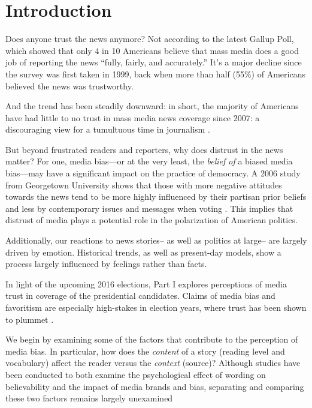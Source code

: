 
\chapter{Introduction} 

Does anyone trust the news anymore? Not according to the latest Gallup Poll, which showed that only 4 in 10 Americans believe that mass media does a good job of reporting the news ``fully, fairly, and accurately.'' It's a major decline since the survey was first taken in 1999, back when more than half (55\%) of Americans believed the news was trustworthy.

And the trend has been steadily downward: in short, the majority of Americans have had little to no trust in mass media news coverage since 2007: a discouraging view for a tumultuous time in journalism \cite{Gallup-trust-2015}.

But beyond frustrated readers and reporters, why does distrust in the news matter? For one, media bias---or at the very least, the \emph{belief of} a biased media bias---may have a significant impact on the practice of democracy. A 2006 study from Georgetown University shows that those with more negative attitudes towards the news tend to be more highly influenced by their partisan prior beliefs and less by contemporary issues and messages when voting \cite{ladd2005attitudes}. This implies that distrust of media plays a potential role in the polarization of American politics.

Additionally, our reactions to news stories-- as well as politics at large-- are largely driven by emotion. Historical trends, as well as present-day models, show a process largely influenced by feelings rather than facts.


In light of the upcoming 2016 elections, Part I explores perceptions of media trust in coverage of the presidential candidates. Claims of media bias and favoritism are especially high-stakes in election years, where trust has been shown to plummet \cite{Gallup-trust-2015}.  

We begin by examining some of the factors that contribute to the perception of media bias. In particular, how does the \emph{content} of a story (reading level and vocabulary) affect the reader versus the \emph{context} (source)? Although studies have been conducted to both examine the psychological effect of wording on believability and the impact of media brands and bias, separating and comparing these two factors remains largely unexamined \cite{weisberg2008seductive, baum2008eye}

